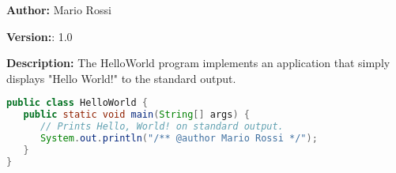 \textbf{Author:} Mario Rossi

\textbf{Version:}: 1.0

\textbf{Description:}
 The HelloWorld program implements an application that simply displays "Hello World!" to the standard output.  

\begin{lstlisting}[language=Java]
public class HelloWorld {
   public static void main(String[] args) {
      // Prints Hello, World! on standard output.
      System.out.println("/** @author Mario Rossi */");
   }
}
\end{lstlisting}
